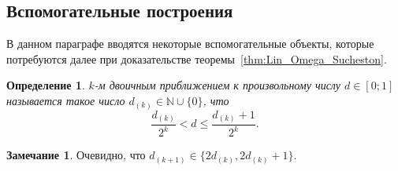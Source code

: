 \documentclass{article}
\theoremstyle{plain}
\newtheorem{definition}{Определение}
\theoremstyle{definition}
\newtheorem{remark}{Замечание}
\begin{document}
\begin{fulltext}
\section{Вспомогательные построения}

В данном параграфе вводятся некоторые вспомогательные объекты,
которые потребуются далее при доказательстве теоремы~\ref{thm:Lin_Omega_Sucheston}.


\begin{definition}
	$k$-м двоичным приближением к произвольному числу $d\in[0;1]$
	называется такое число $d_{(k)}\in\mathbb{N}\cup\{0\}$,
	что
	\begin{equation}
		\label{eq:binary_approximations_for_number}
		\frac{d_{(k)}}{2^k} < d \leq \frac{d_{(k)}+1}{2^k}
		.
	\end{equation}
\end{definition}

\begin{remark}
	Очевидно, что $d_{(k+1)}\in\{2d_{(k)},2d_{(k)}+1\}$.
\end{remark}



\end{fulltext}
\end{document}
